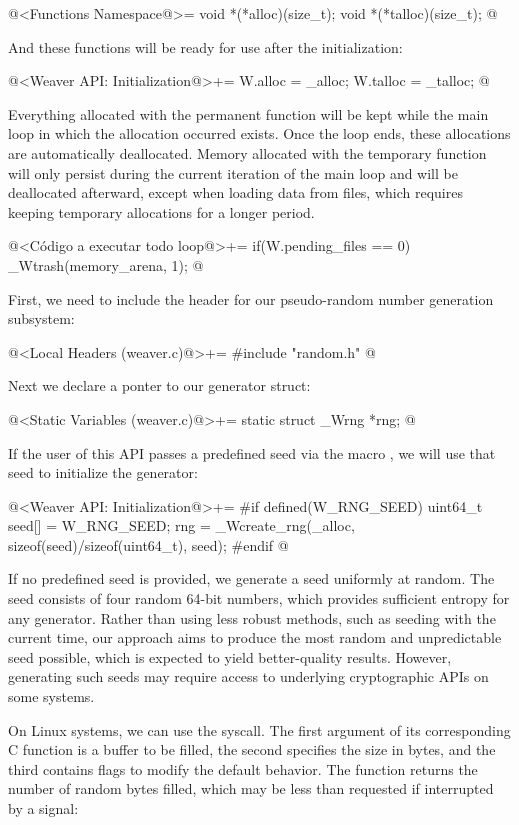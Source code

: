 \iniciocodigo
@<Functions Namespace@>=
void *(*alloc)(size_t);
void *(*talloc)(size_t);
@
\fimcodigo

And these functions will be ready for use after the initialization:

\iniciocodigo
@<Weaver API: Initialization@>+=
W.alloc = _alloc;
W.talloc = _talloc;
@
\fimcodigo

Everything allocated with the permanent function will be kept while
the main loop in which the allocation occurred exists. Once the loop
ends, these allocations are automatically deallocated. Memory
allocated with the temporary function will only persist during the
current iteration of the main loop and will be deallocated afterward,
except when loading data from files, which requires keeping temporary
allocations for a longer period.

\iniciocodigo
@<Código a executar todo loop@>+=
if(W.pending_files == 0)
  _Wtrash(memory_arena, 1);
@
\fimcodigo


First, we need to include the header for our pseudo-random number
generation subsystem:

\iniciocodigo
@<Local Headers (weaver.c)@>+=
#include "random.h"
@
\fimcodigo

Next we declare a ponter to our generator struct:

\iniciocodigo
@<Static Variables (weaver.c)@>+=
static struct _Wrng *rng;
@
\fimcodigo

If the user of this API passes a predefined seed via the
macro , we will use that seed to initialize the
generator:

\iniciocodigo
@<Weaver API: Initialization@>+=
#if defined(W_RNG_SEED)
{
  uint64_t seed[] = W_RNG_SEED;
  rng = _Wcreate_rng(_alloc, sizeof(seed)/sizeof(uint64_t), seed);
}
#endif
@
\fimcodigo

If no predefined seed is provided, we generate a seed uniformly at
random. The seed consists of four random 64-bit numbers, which
provides sufficient entropy for any generator. Rather than using less
robust methods, such as seeding with the current time, our approach
aims to produce the most random and unpredictable seed possible, which
is expected to yield better-quality results. However, generating such
seeds may require access to underlying cryptographic APIs on some
systems.

On Linux systems, we can use the  syscall. The
first argument of its corresponding C function is a buffer to be
filled, the second specifies the size in bytes, and the third contains
flags to modify the default behavior. The function returns the number
of random bytes filled, which may be less than requested if
interrupted by a signal:

